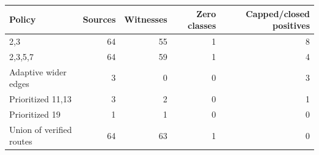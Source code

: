 \begin{tabular}{lrrrr}\toprule
Policy & Sources & Witnesses & Zero classes & Capped/closed positives\\\midrule
2,3 & 64 & 55 & 1 & 8\\
2,3,5,7 & 64 & 59 & 1 & 4\\
Adaptive wider edges & 3 & 0 & 0 & 3\\
Prioritized 11,13 & 3 & 2 & 0 & 1\\
Prioritized 19 & 1 & 1 & 0 & 0\\
Union of verified routes & 64 & 63 & 1 & 0\\
\bottomrule\end{tabular}
